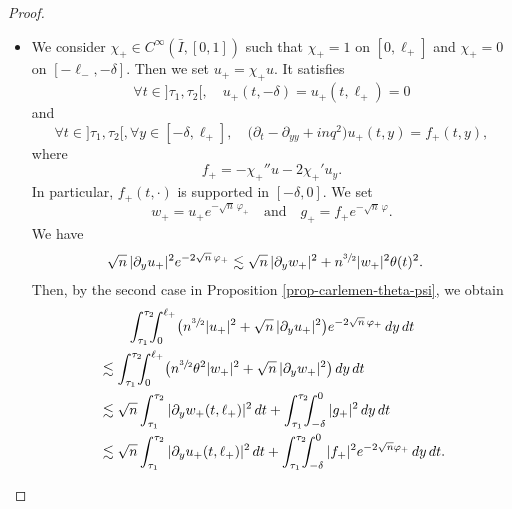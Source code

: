 \documentclass[10pt]{amsart}
\theoremstyle{plain}
\theoremstyle{definition}
\newcommand{\abs}[1]{\vert #1\vert}
\newcommand{\1}{\mathds 1}
\let\d\delta
\let\th\theta
\let\f\varphi
\let\h\chi
\begin{document}
\begin{proof}
\begin{itemize}
\item
We consider $\h_+ \in C^\infty(\bar I,[0,1])$ such that $\h_+ = 1$ on $[0,\ell_+]$ and $\h_+ = 0$ on $[-\ell_-,-\d]$. Then we set $u_+ = \h_+ u$. It satisfies
\[
\forall t \in{}]\tau_1,\tau_2[, \quad u_+(t,-\d) = u_+(t,\ell_+) = 0
\]
and
\[
\forall t \in{}]\tau_1,\tau_2[, \forall y \in [-\d,\ell_+], \quad \bigl(\partial_t - \partial_{yy} + inq^2 \bigr) u_+(t,y) = f_+(t,y),
\]
where
\[
f_+ = - \h_+'' u - 2 \h_+' u_y.
\]
In particular, $f_+(t,\cdot)$ is supported in $[-\d,0]$. We set
\[
w_+ = u_+ e^{-\sqrt n\,\f_+}
\quad \text{and} \quad
g_+ = f_+ e^{-\sqrt n\,\f}.
\]
We have
\begin{align*}
\sqrt n\,\abs{\partial_y u_+}^2 e^{-2 \sqrt n\,\f_+}
& \lesssim \sqrt n\,\abs{\partial_y w_+}^2 + n^{\sfrac 32} \abs{w_+}^2 \th(t)^2 .
\end{align*}
Then, by the second case in Proposition \ref{prop-carlemen-theta-psi}, we obtain
\begin{multline}\label{eq++}
\int_{\tau_1}^{\tau_2}\hspace*{-2mm} \int_0^{\ell_+} \bigl(n^{\sfrac 32} \abs {u_+}^2 + \sqrt n\,\abs{\partial_y u_+}^2 \bigr) e^{- 2 \sqrt n\,\f_+} \, dy \, dt\\
\begin{aligned}
& \lesssim \int_{\tau_1}^{\tau_2}\hspace*{-2mm} \int_0^{\ell_+} \bigl(n^{\sfrac 32} \th^2 \abs {w_+}^2 + \sqrt n\,\abs{\partial_y w_+}^2 \bigr) \, dy \, dt\\
& \lesssim \sqrt n \int_{\tau_1}^{\tau_2} \abs{\partial_y w_+(t,\ell_+)}^2 \, dt + \int_{\tau_1}^{\tau_2}\hspace*{-2mm} \int_{-\d}^0 \abs {g_+}^2 \, dy \, dt\\
& \lesssim \sqrt n \int_{\tau_1}^{\tau_2} \abs{\partial_y u_+(t,\ell_+)}^2 \, dt + \int_{\tau_1}^{\tau_2}\hspace*{-2mm} \int_{-\d}^0 \abs {f_+}^2 e^{-2\sqrt n \f_+} \, dy \, dt.
\end{aligned}
\end{multline}


\end{itemize}
\end{proof}
\end{document}

